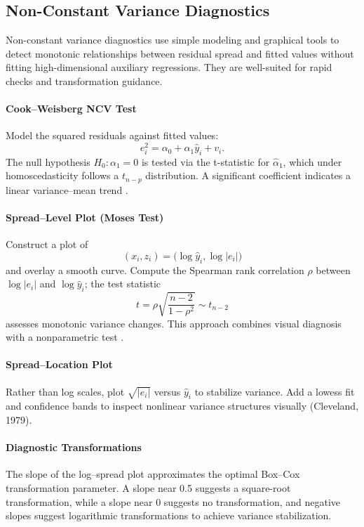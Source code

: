 \subsection{Non-Constant Variance Diagnostics}\label{sec:ncv-diagnostics}
Non-constant variance diagnostics use simple modeling and graphical tools to detect monotonic relationships between residual spread and fitted values without fitting high-dimensional auxiliary regressions. They are well-suited for rapid checks and transformation guidance.

\paragraph{Cook--Weisberg NCV Test}\label{sec:ncv}
Model the squared residuals against fitted values:
\begin{equation}
  e_i^2 = \alpha_0 + \alpha_1\hat y_i + v_i.
\end{equation}
The null hypothesis $H_0: \alpha_1 = 0$ is tested via the t-statistic for $\hat\alpha_1$, which under homoscedasticity follows a $t_{n-p}$ distribution. A significant coefficient indicates a linear variance–mean trend \citep{cook1983detection}.

\paragraph{Spread–Level Plot (Moses Test)}\label{sec:moses}
Construct a plot of
\[ (x_i, z_i) = \bigl(\log\hat y_i, \log|e_i|\bigr) \]
and overlay a smooth curve. Compute the Spearman rank correlation $\rho$ between $\log|e_i|$ and $\log\hat y_i$; the test statistic
\[ t = \rho\sqrt{\frac{n-2}{1-\rho^2}} \sim t_{n-2} \]
assesses monotonic variance changes. This approach combines visual diagnosis with a nonparametric test \citep{moses1964nonparametric}.

\paragraph{Spread–Location Plot}\label{sec:spread-location}
Rather than log scales, plot $\sqrt{|e_i|}$ versus $\hat y_i$ to stabilize variance. Add a lowess fit and confidence bands to inspect nonlinear variance structures visually (Cleveland, 1979).

\paragraph{Diagnostic Transformations}\label{sec:transform}
The slope of the log–spread plot approximates the optimal Box–Cox transformation parameter. A slope near 0.5 suggests a square-root transformation, while a slope near 0 suggests no transformation, and negative slopes suggest logarithmic transformations to achieve variance stabilization.


